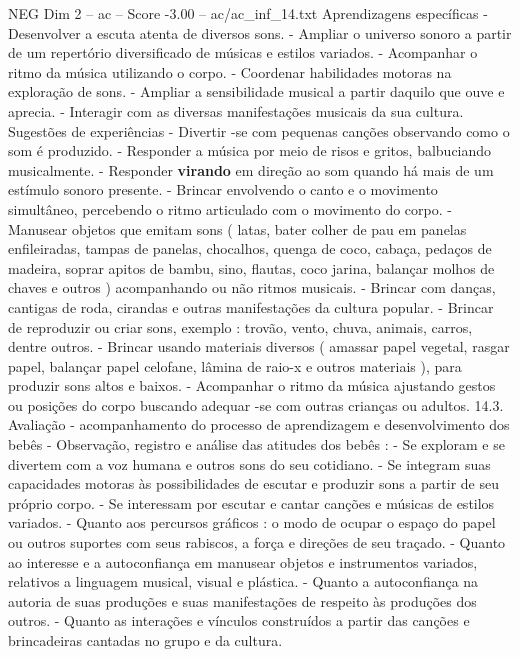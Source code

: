\begin{textsample}{NEG Dim 2 – ac – Score -3.00 – ac/ac\_inf\_14.txt}
Aprendizagens específicas - Desenvolver a escuta atenta de diversos sons. - Ampliar o universo sonoro a partir de um repertório diversificado de músicas e estilos variados. - Acompanhar o ritmo da música utilizando o corpo. - Coordenar habilidades motoras na exploração de sons. - Ampliar a sensibilidade musical a partir daquilo que ouve e aprecia. - Interagir com as diversas manifestações musicais da sua cultura.
Sugestões de experiências - Divertir -se com pequenas canções observando como o som é produzido. - Responder a música por meio de risos e gritos, balbuciando musicalmente. - Responder \textbf{virando} em direção ao som quando há mais de um estímulo sonoro presente. - Brincar envolvendo o canto e o movimento simultâneo, percebendo o ritmo articulado com o movimento do corpo. - Manusear objetos que emitam sons ( latas, bater colher de pau em panelas enfileiradas, tampas de panelas, chocalhos, quenga de coco, cabaça, pedaços de madeira, soprar apitos de bambu, sino, flautas, coco jarina, balançar molhos de chaves e outros ) acompanhando ou não ritmos musicais. - Brincar com danças, cantigas de roda, cirandas e outras manifestações da cultura popular. - Brincar de reproduzir ou criar sons, exemplo : trovão, vento, chuva, animais, carros, dentre outros. - Brincar usando materiais diversos ( amassar papel vegetal, rasgar papel, balançar papel celofane, lâmina de raio-x e outros materiais ), para produzir sons altos e baixos. - Acompanhar o ritmo da música ajustando gestos ou posições do corpo buscando adequar -se com outras crianças ou adultos. 14.3.
Avaliação - acompanhamento do processo de aprendizagem e desenvolvimento dos bebês - Observação, registro e análise das atitudes dos bebês : - Se exploram e se divertem com a voz humana e outros sons do seu cotidiano. - Se integram suas capacidades motoras às possibilidades de escutar e produzir sons a partir de seu próprio corpo. - Se interessam por escutar e cantar canções e músicas de estilos variados. - Quanto aos percursos gráficos : o modo de ocupar o espaço do papel ou outros suportes com seus rabiscos, a força e direções de seu traçado. - Quanto ao interesse e a autoconfiança em manusear objetos e instrumentos variados, relativos a linguagem musical, visual e plástica. - Quanto a autoconfiança na autoria de suas produções e suas manifestações de respeito às produções dos outros. - Quanto as interações e vínculos construídos a partir das canções e brincadeiras cantadas no grupo e da cultura.

\end{textsample}

